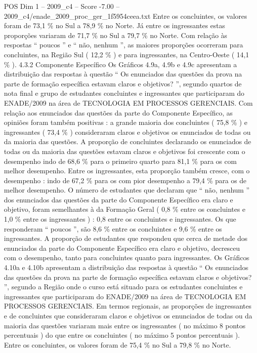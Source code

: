 \begin{textsample}{POS Dim 1 – 2009\_c4 – Score -7.00 – 2009\_c4/enade\_2009\_proc\_ger\_1f5954ceea.txt}
Entre os concluintes, os valores foram de 73,1 \% no Sul a 78,9 \% no Norte.
Já entre os ingressantes estas proporções variaram de 71,7 \% no Sul a 79,7 \% no Norte.
Com relação às respostas “ poucos ” e “ não, nenhum ”, as maiores proporções ocorreram para concluintes, na Região Sul ( 12,2 \% ) e para ingressantes, na Centro-Oeste ( 14,1 \% ). 4.3.2 Componente Específico Os Gráficos 4.9a, 4.9b e 4.9c apresentam a distribuição das respostas à questão “ Os enunciados das questões da prova na parte de formação específica estavam claros e objetivos? ”, segundo quartos de nota final e grupo de estudantes concluintes e ingressantes que participaram do ENADE/2009 na área de TECNOLOGIA EM PROCESSOS GERENCIAIS.
Com relação aos enunciados das questões da parte do Componente Específico, as opiniões foram também positivas : a grande maioria dos concluintes ( 75,8 \% ) e ingressantes ( 73,4 \% ) consideraram claros e objetivos os enunciados de todas ou da maioria das questões.
A proporção de concluintes declarando os enunciados de todas ou da maioria das questões estavam claros e objetivos foi crescente com o desempenho indo de 68,6 \% para o primeiro quarto para 81,1 \% para os com melhor desempenho.
Entre os ingressantes, esta proporção também cresce, com o desempenho : indo de 67,2 \% para os com pior desempenho a 79,4 \% para os de melhor desempenho.
O número de estudantes que declaram que “ não, nenhum ” dos enunciados das questões da parte do Componente Específico era claro e objetivo, foram semelhantes à da Formação Geral ( 0,8 \% entre os concluintes e 1,0 \% entre os ingressantes ) : 0,8 entre os concluintes e ingressantes.
Os que responderam “ poucos ”, são 8,6 \% entre os concluintes e 9,6 \% entre os ingressantes.
A proporção de estudantes que respondeu que cerca de metade dos enunciados da parte do Componente Específico era claro e objetivo, decresceu com o desempenho, tanto para concluintes quanto para ingressantes.
Os Gráficos 4.10a e 4.10b apresentam a distribuição das respostas à questão “ Os enunciados das questões da prova na parte de formação específica estavam claros e objetivos? ”, segundo a Região onde o curso está situado para os estudantes concluintes e ingressantes que participaram do ENADE/2009 na área de TECNOLOGIA EM PROCESSOS GERENCIAIS.
Em termos regionais, as proporções de ingressantes e de concluintes que consideraram claros e objetivos os enunciados de todas ou da maioria das questões variaram mais entre os ingressantes ( no máximo 8 pontos percentuais ) do que entre os concluintes ( no máximo 5 pontos percentuais ).
Entre os concluintes, os valores foram de 75,4 \% no Sul a 79,8 \% no Norte.

\end{textsample}

